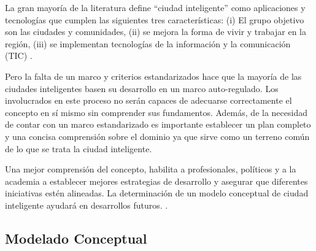 \documentclass[a4paper,fleqn,spanish]{cas-dc}
\begin{document}
La gran mayoría de la literatura define “ciudad inteligente” como
aplicaciones y tecnologías que cumplen las siguientes tres características:
(i) El grupo objetivo son las ciudades y comunidades,
(ii) se mejora la forma de vivir y trabajar en la región,
(iii) se implementan tecnologías de la información y la comunicación (TIC)
\cite{stubinger_understanding_2020}.

Pero la falta de un marco y criterios estandarizados
hace que la mayoría de las ciudades inteligentes basen su
desarrollo en un marco auto-regulado.
Los involucrados en este proceso
no serán capaces de adecuarse correctamente el concepto
en sí mismo sin comprender sus fundamentos.
Además, de la necesidad de contar con un marco estandarizado
es importante establecer un plan completo y
una concisa comprensión sobre el dominio
ya que sirve como un terreno común de lo que se trata la ciudad inteligente.

Una mejor comprensión del concepto,
habilita a profesionales, políticos y a la academia
a establecer mejores estrategias de desarrollo
y asegurar que diferentes iniciativas estén alineadas.
La determinación de un modelo conceptual de ciudad inteligente
ayudará en desarrollos futuros.
.







\subsection{Modelado Conceptual}\label{afirmacion}
\end{document}
